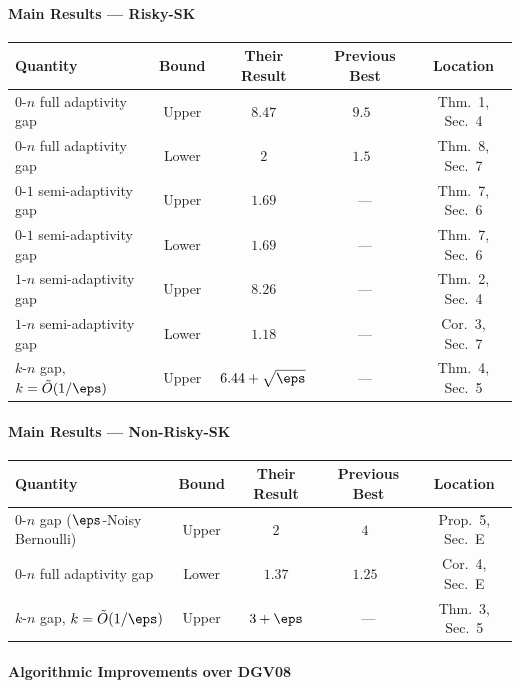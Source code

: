 \paragraph{Main Results --- Risky-SK}

\begin{center}
\begin{tabular}{l c c c c}
    \hline
    Quantity & Bound & Their Result & Previous Best & Location \\
    \hline
    $0$-$n$ full adaptivity gap & Upper & $8.47$ & $9.5$~\cite{DeanGoemansVondrak2008} & Thm.~1, Sec.~4 \\
    $0$-$n$ full adaptivity gap & Lower & $2$ & $1.5$~\cite{LV14} & Thm.~8, Sec.~7 \\
    $0$-$1$ semi-adaptivity gap & Upper & $1.69$ & --- & Thm.~7, Sec.~6 \\
    $0$-$1$ semi-adaptivity gap & Lower & $1.69$ & --- & Thm.~7, Sec.~6 \\
    $1$-$n$ semi-adaptivity gap & Upper & $8.26$ & --- & Thm.~2, Sec.~4 \\
    $1$-$n$ semi-adaptivity gap & Lower & $1.18$ & --- & Cor.~3, Sec.~7 \\
    $k$-$n$ gap, $k = \tilde{O}(1/\eps)$ & Upper & $6.44 + \sqrt{\eps}$ & --- & Thm.~4, Sec.~5 \\
    \hline
\end{tabular}
\end{center}

\paragraph{Main Results --- Non-Risky-SK}

\begin{center}
\begin{tabular}{l c c c c}
    \hline
    Quantity & Bound & Their Result & Previous Best & Location \\
    \hline
    $0$-$n$ gap ($\eps$-Noisy Bernoulli) & Upper & $2$ & $4$~\cite{DeanGoemansVondrak2008} & Prop.~5, Sec.~E \\
    $0$-$n$ full adaptivity gap & Lower & $1.37$ & $1.25$~\cite{DeanGoemansVondrak2008} & Cor.~4, Sec.~E \\
    $k$-$n$ gap, $k = \tilde{O}(1/\eps)$ & Upper & $3 + \eps$ & --- & Thm.~3, Sec.~5 \\
    \hline
\end{tabular}
\end{center}

\paragraph{Algorithmic Improvements over DGV08}

